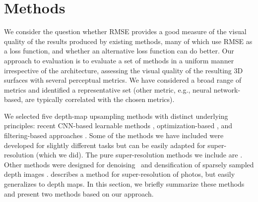 
\section{Methods}
\label{sec:methods}


We consider the question whether RMSE provides a good measure of the visual quality of the results produced by existing methods, many of which use RMSE as a loss function, and whether an alternative loss function can do better. 
Our approach to evaluation is to evaluate a set of methods in a uniform manner irrespective of the architecture, assessing the visual quality of the resulting 3D surfaces with several perceptual metrics.  We have considered a broad range of metrics and identified a representative set (other metric, e.g., neural network-based, are typically correlated with the chosen metrics).


We selected five depth-map upsampling methods with distinct underlying principles: recent CNN-based learnable methods \cite{riegler2016deep,hui2016depth,mal2018sparse,yan2018ddrnet,Ulyanov_2018_CVPR},
optimization-based \cite{haefner2018fight}, and filtering-based approaches \cite{xie2016edge}. 
Some of the methods we have included were developed for slightly different tasks but can be easily adapted for 
super-resolution (which we did).  
The pure super-resolution methods we include are \cite{riegler2016deep,hui2016depth,haefner2018fight,xie2016edge}. Other methods were designed for denoising~\cite{yan2018ddrnet,gu2017learning} and  densification of sparsely sampled depth images \cite{mal2018sparse}. \cite{Ulyanov_2018_CVPR} describes a method for  super-resolution of photos, but easily generalizes to depth maps. 
In this section, we briefly summarize these methods and present two methods based on our approach.

